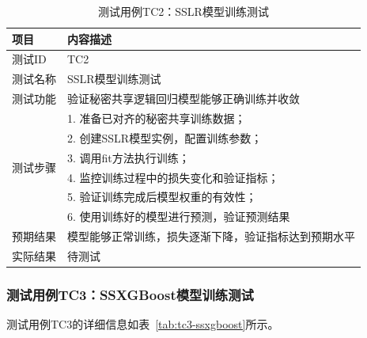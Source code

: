 \begin{table}[htbp]
    \centering
    \caption{测试用例TC2：SSLR模型训练测试}
    \label{tab:tc2-sslr}
    \begin{tabular}{lp{9cm}}
        \toprule
        \textbf{项目} & \textbf{内容描述} \\
        \midrule
        测试ID & TC2 \\
        测试名称 & SSLR模型训练测试 \\
        测试功能 & 验证秘密共享逻辑回归模型能够正确训练并收敛 \\
        \midrule
        \multirow{6}{*}{测试步骤} & 1. 准备已对齐的秘密共享训练数据； \\
        & 2. 创建SSLR模型实例，配置训练参数； \\
        & 3. 调用fit方法执行训练； \\
        & 4. 监控训练过程中的损失变化和验证指标； \\
        & 5. 验证训练完成后模型权重的有效性； \\
        & 6. 使用训练好的模型进行预测，验证预测结果 \\
        \midrule
        预期结果 & 模型能够正常训练，损失逐渐下降，验证指标达到预期水平 \\
        实际结果 & 待测试 \\
        \bottomrule
    \end{tabular}
\end{table}

\subsubsection{测试用例TC3：SSXGBoost模型训练测试}

测试用例TC3的详细信息如表~\ref{tab:tc3-ssxgboost}所示。

